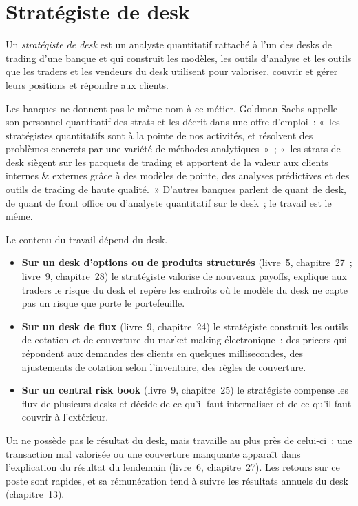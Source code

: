 \section{Stratégiste de desk}

\begin{definition}\label{def:in:bank-quant:strat}
Un \emph{stratégiste de desk} est un analyste quantitatif rattaché à l'un des desks de trading d'une banque et
qui construit les modèles, les outils d'analyse et les outils que les traders et les vendeurs du desk utilisent pour valoriser, couvrir et gérer leurs
positions et répondre aux clients.
\end{definition}

Les banques ne donnent pas le même nom à ce métier. Goldman Sachs appelle son personnel quantitatif des strats et les décrit dans une offre d'emploi~:
«~les stratégistes quantitatifs sont à la pointe de nos activités, et résolvent des problèmes concrets par une variété de
méthodes analytiques~»~; «~les strats de desk siègent sur les parquets de trading et apportent de la valeur aux clients internes \& externes grâce à
des modèles de pointe, des analyses prédictives et des outils de trading de haute qualité.~» D'autres banques parlent de quant de desk, de quant de front office
ou d'analyste quantitatif sur le desk~; le travail est le même.

Le contenu du travail dépend du desk.
\begin{itemize}
\item \textbf{Sur un desk d'options ou de produits structurés} (livre~5, chapitre~27~; livre~9, chapitre~28) le stratégiste valorise
de nouveaux payoffs, explique aux traders le risque du desk et repère les endroits où le modèle du desk ne capte pas un risque que porte le portefeuille.
\item \textbf{Sur un desk de flux} (livre~9, chapitre~24) le stratégiste construit les outils de cotation et de couverture du market
making électronique~: des pricers qui répondent aux demandes des clients en quelques millisecondes, des ajustements de cotation selon l'inventaire, des règles de couverture.
\item \textbf{Sur un central risk book} (livre~9, chapitre~25) le stratégiste compense les flux de plusieurs desks et décide
de ce qu'il faut internaliser et de ce qu'il faut couvrir à l'extérieur.
\end{itemize}
Un  ne possède pas le résultat du desk, mais travaille au plus près de celui-ci~: une transaction mal valorisée ou une couverture manquante
apparaît dans l'explication du résultat du lendemain (livre~6, chapitre~27). Les retours sur ce poste sont rapides, et sa rémunération tend
à suivre les résultats annuels du desk (chapitre~13).

